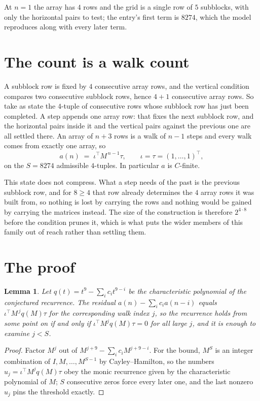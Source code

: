 \documentclass[11pt,a4paper]{article}
\theoremstyle{plain}
\newtheorem{lemma}[theorem]{Lemma}
\theoremstyle{definition}
\begin{document}
At $n=1$ the array has $4$ rows and the grid is a single row of $5$
subblocks, with only the horizontal pairs to test; the entry's first term is
$8274$, which the model reproduces along with every later term.

\section{The count is a walk count}

A subblock row is fixed by $4$ consecutive array rows, and the vertical condition compares
two consecutive subblock rows, hence $4+1$ consecutive array rows. So take as state the
$4$-tuple of consecutive rows whose subblock row has just been completed. A step appends one
array row: that fixes the next subblock row, and the horizontal pairs inside it and the
vertical pairs against the previous one are all settled there. An array of $n+3$ rows is
a walk of $n-1$ steps and every walk comes from exactly one array, so
\[
a(n)\;=\;\iota^{\!\top}M^{\,n-1}\tau,\qquad\iota=\tau=(1,\dots,1)^{\!\top},
\]
on the $S=8274$ admissible $4$-tuples. In particular $a$ is $C$-finite.

This state does not compress. What a step needs of the past is the previous subblock row, and
for $8\ge4$ that row already determines the $4$ array rows it was built from, so nothing
is lost by carrying the rows and nothing would be gained by carrying the matrices instead. The
size of the construction is therefore $2^{4\cdot8}$ before the condition prunes
it, which is what puts the wider members of this family out of reach rather than settling them.

\section{The proof}

\begin{lemma}\label{lem:crit}
Let $q(t)=t^{9}-\sum_i c_it^{9-i}$ be the characteristic polynomial of the
conjectured recurrence. The residual $a(n)-\sum_ic_ia(n-i)$ equals
$\iota^{\!\top}M^{\,j}q(M)\tau$ for the corresponding walk index $j$, so the recurrence
holds from some point on if and only if $\iota^{\!\top}M^{j}q(M)\tau=0$ for all large $j$,
and it is enough to examine $j<S$.
\end{lemma}

\begin{proof}
Factor $M^{j}$ out of $M^{j+9}-\sum_ic_iM^{j+9-i}$. For the bound, $M^{S}$
is an integer combination of $I,M,\dots,M^{S-1}$ by Cayley--Hamilton, so the numbers
$u_j=\iota^{\!\top}M^{j}q(M)\tau$ obey the monic recurrence given by the characteristic
polynomial of $M$; $S$ consecutive zeros force every later one, and the last nonzero $u_j$
pins the threshold exactly.
\end{proof}
\end{document}

